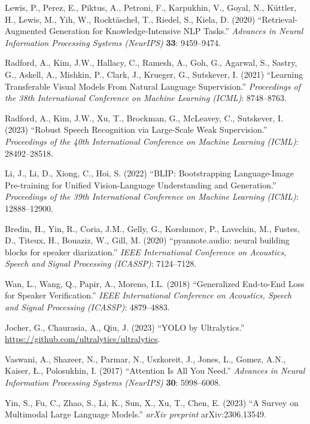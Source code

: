 \documentclass[3p,times,procedia]{elsarticle}
\begin{document}
\begin{thebibliography}{}

Lewis, P., Perez, E., Piktus, A., Petroni, F., Karpukhin, V., Goyal, N., K\"{u}ttler, H., Lewis, M., Yih, W., Rockt\"{a}schel, T., Riedel, S., Kiela, D. (2020) ``Retrieval-Augmented Generation for Knowledge-Intensive NLP Tasks.'' {\it Advances in Neural Information Processing Systems (NeurIPS)} {\bf 33}: 9459--9474.

Radford, A., Kim, J.W., Hallacy, C., Ramesh, A., Goh, G., Agarwal, S., Sastry, G., Askell, A., Mishkin, P., Clark, J., Krueger, G., Sutskever, I. (2021) ``Learning Transferable Visual Models From Natural Language Supervision.'' {\it Proceedings of the 38th International Conference on Machine Learning (ICML)}: 8748--8763.

Radford, A., Kim, J.W., Xu, T., Brockman, G., McLeavey, C., Sutskever, I. (2023) ``Robust Speech Recognition via Large-Scale Weak Supervision.'' {\it Proceedings of the 40th International Conference on Machine Learning (ICML)}: 28492--28518.

Li, J., Li, D., Xiong, C., Hoi, S. (2022) ``BLIP: Bootstrapping Language-Image Pre-training for Unified Vision-Language Understanding and Generation.'' {\it Proceedings of the 39th International Conference on Machine Learning (ICML)}: 12888--12900.

Bredin, H., Yin, R., Coria, J.M., Gelly, G., Korshunov, P., Lavechin, M., Fustes, D., Titeux, H., Bouaziz, W., Gill, M. (2020) ``pyannote.audio: neural building blocks for speaker diarization.'' {\it IEEE International Conference on Acoustics, Speech and Signal Processing (ICASSP)}: 7124--7128.

Wan, L., Wang, Q., Papir, A., Moreno, I.L. (2018) ``Generalized End-to-End Loss for Speaker Verification.'' {\it IEEE International Conference on Acoustics, Speech and Signal Processing (ICASSP)}: 4879--4883.

Jocher, G., Chaurasia, A., Qiu, J. (2023) ``YOLO by Ultralytics.'' \url{https://github.com/ultralytics/ultralytics}.

Vaswani, A., Shazeer, N., Parmar, N., Uszkoreit, J., Jones, L., Gomez, A.N., Kaiser, {\L}., Polosukhin, I. (2017) ``Attention Is All You Need.'' {\it Advances in Neural Information Processing Systems (NeurIPS)} {\bf 30}: 5998--6008.

Yin, S., Fu, C., Zhao, S., Li, K., Sun, X., Xu, T., Chen, E. (2023) ``A Survey on Multimodal Large Language Models.'' {\it arXiv preprint} arXiv:2306.13549.


\end{thebibliography}
\end{document}
